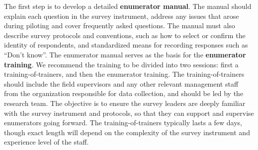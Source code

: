The first step is to develop a detailed \textbf{enumerator manual}.
The manual should explain each question in the survey instrument,
address any issues that arose during piloting
and cover frequently asked questions.
The manual must also describe survey protocols and conventions,
such as how to select or confirm the identity of respondents,
and standardized means for recording responses such as ``Don't know''.
The enumerator manual serves as the basis for the \textbf{enumerator training}.
We recommend the training to be divided into two sessions:
first a training-of-trainers, and then the enumerator training. 
The training-of-trainers should include the field supervisors 
and any other relevant management staff from the organization responsible for data collection, 
and should be led by the research team.
The objective is to ensure the survey leaders are 
deeply familiar with the survey instrument and protocols,
so that they can support and supervise enumerators going forward. 
The training-of-trainers typically lasts a few days,
though exact length will depend on the complexity of the 
survey instrument and experience level of the staff. 

